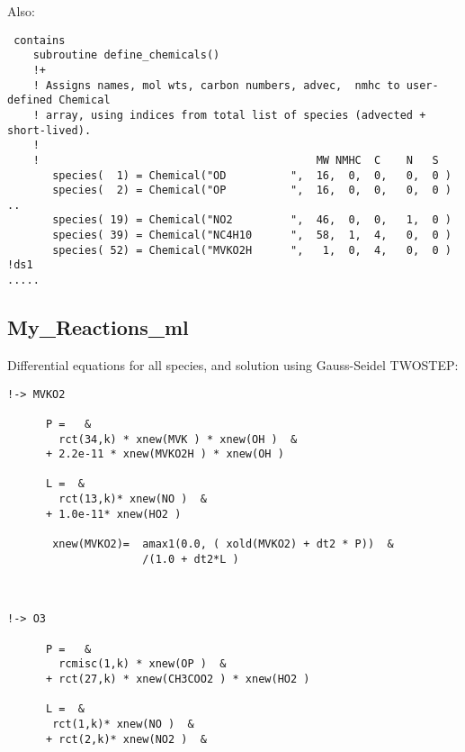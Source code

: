 Also:
\begin{verbatim}
 contains
    subroutine define_chemicals()
    !+
    ! Assigns names, mol wts, carbon numbers, advec,  nmhc to user-defined Chemical
    ! array, using indices from total list of species (advected + short-lived).
    !
    !                                           MW NMHC  C    N   S
       species(  1) = Chemical("OD          ",  16,  0,  0,   0,  0 )
       species(  2) = Chemical("OP          ",  16,  0,  0,   0,  0 )
..
       species( 19) = Chemical("NO2         ",  46,  0,  0,   1,  0 )
       species( 39) = Chemical("NC4H10      ",  58,  1,  4,   0,  0 )
       species( 52) = Chemical("MVKO2H      ",   1,  0,  4,   0,  0 ) !ds1
.....
\end{verbatim}

\newpage
\subsection*{My\_Reactions\_ml}

Differential equations for all species, and solution
using Gauss-Seidel TWOSTEP:

\begin{verbatim}
!-> MVKO2

      P =   &
        rct(34,k) * xnew(MVK ) * xnew(OH )  &
      + 2.2e-11 * xnew(MVKO2H ) * xnew(OH )

      L =  &
        rct(13,k)* xnew(NO )  &
      + 1.0e-11* xnew(HO2 )

       xnew(MVKO2)=  amax1(0.0, ( xold(MVKO2) + dt2 * P))  &
                     /(1.0 + dt2*L )



!-> O3

      P =   &
        rcmisc(1,k) * xnew(OP )  &
      + rct(27,k) * xnew(CH3COO2 ) * xnew(HO2 )

      L =  &
       rct(1,k)* xnew(NO )  &
      + rct(2,k)* xnew(NO2 )  &
\end{verbatim}

